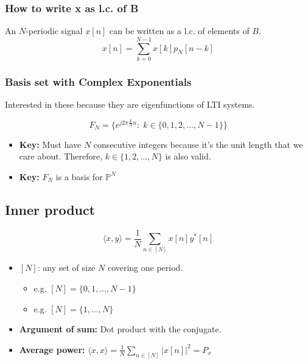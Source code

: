 \subsubsection{How to write x as l.c. of B}
\begin{definition}
    An $N$-periodic signal $x[n]$ can be written as a l.c. of elements of $B$. 
    \begin{equation*}
        x[n] = \sum_{k=0}^{N-1} x[k] p_N [n-k] 
    \end{equation*}
\end{definition}

\begin{example}
\end{example}

\subsubsection{Basis set with Complex Exponentials}
Interested in these because they are eigenfunctions of LTI systems. 

\begin{definition}
    \begin{equation*}
        F_N = \{e^{j2\pi \frac{k}{N} n}: \; k \in \{0,1,2,\ldots,N-1\}\}
    \end{equation*}
    \begin{itemize}
        \item \textbf{Key:} Must have $N$ consecutive integers because it's the unit length that we care about. Therefore, $k \in \{1,2,\ldots,N\}$ is also valid. 
        \item \textbf{Key:} $F_N$ is a basis for $\mathbb{P}^N$
    \end{itemize}
\end{definition}

\subsection{Inner product}
\begin{definition}
    \begin{equation*}
        \langle x,y\rangle = \frac{1}{N} \sum_{n \in [N]} x[n] y^* [n] 
    \end{equation*}
    \begin{itemize}
        \item $[N]$: any set of size $N$ covering one period. 
        \begin{itemize}
            \item e.g. $[N] = \{0,1,\ldots,N-1\}$
            \item e.g. $[N] = \{1,\ldots,N\}$
        \end{itemize}
        \item \textbf{Argument of sum:} Dot product with the conjugate. 
        \item \textbf{Average power:} $\langle x,x \rangle = \frac{1}{N} \sum_{n \in [N]} |x[n]|^2 = P_x$
    \end{itemize}
\end{definition}

